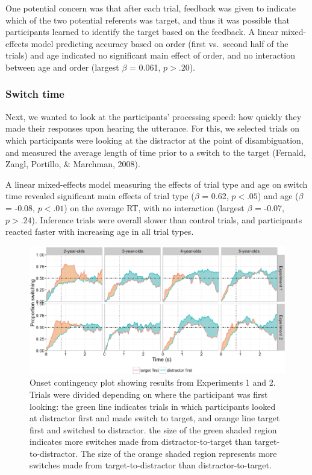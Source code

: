 \documentclass[a4paper,man,apacite,floatsintext]{apa6}
\newenvironment{CodeChunk}{}{}
\begin{document}
One potential concern was that after each trial, feedback was given to
indicate which of the two potential referents was target, and thus it
was possible that participants learned to identify the target based on
the feedback. A linear mixed-effects model predicting accuracy based on
order (first vs.~second half of the trials) and age indicated no
significant main effect of order, and no interaction between age and
order (largest \(\beta\) = 0.061, \(p >.20\)).

\subsubsection{Switch time}\label{switch-time}

Next, we wanted to look at the participants' processing speed: how
quickly they made their responses upon hearing the utterance. For this,
we selected trials on which participants were looking at the distractor
at the point of disambiguation, and measured the average length of time
prior to a switch to the target (Fernald, Zangl, Portillo, \& Marchman,
2008).

A linear mixed-effects model measuring the effects of trial type and age
on switch time revealed significant main effects of trial type
(\(\beta\) = 0.62, \(p <.05\)) and age (\(\beta\) = -0.08, \(p <.01\))
on the average RT, with no interaction (largest \(\beta\) = -0.07,
\(p >.24\)). Inference trials were overall slower than control trials,
and participants reacted faster with increasing age in all trial types.

\begin{CodeChunk}
\begin{figure}[H]

{\centering \includegraphics{figs/et_ons-1} 

}

\caption[Onset contingency plot showing results from Experiments 1 and 2]{Onset contingency plot showing results from Experiments 1 and 2. Trials were divided depending on where the participant was first looking: the green line indicates trials in which participants looked at distractor first and made switch to target, and orange line target first and switched to distractor. the size of the green shaded region indicates more switches made from distractor-to-target than target-to-distractor. The size of the orange shaded region represents more switches made from target-to-distractor than distractor-to-target.}\label{fig:et_ons}
\end{figure}
\end{CodeChunk}
\end{document}

